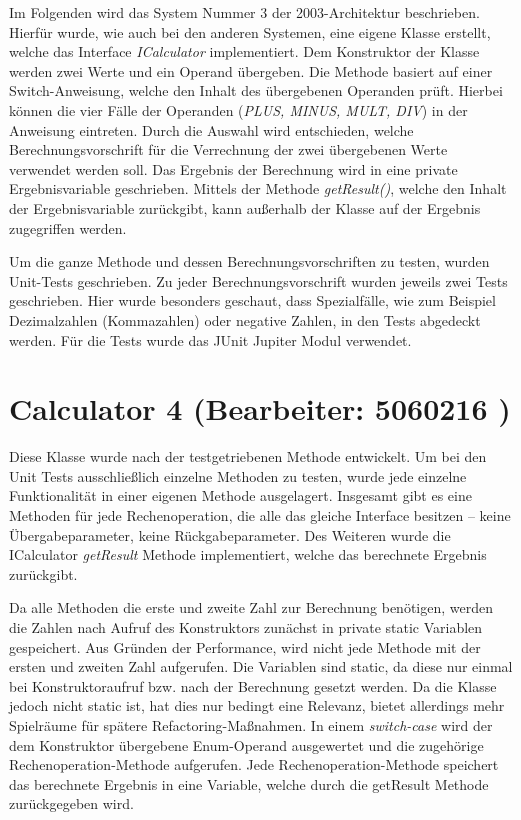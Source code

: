 Im Folgenden wird das System Nummer 3 der 2003-Architektur beschrieben. Hierfür wurde, wie auch bei den anderen Systemen, eine eigene Klasse erstellt, welche das Interface \textit{ICalculator} implementiert. Dem Konstruktor der Klasse werden zwei Werte und ein Operand übergeben. Die Methode basiert auf einer Switch-Anweisung, welche den Inhalt des übergebenen Operanden prüft. Hierbei können die vier Fälle der Operanden (\textit{PLUS, MINUS, MULT, DIV}) in der Anweisung eintreten. Durch die Auswahl wird entschieden, welche Berechnungsvorschrift für die Verrechnung der zwei übergebenen Werte verwendet werden soll.  Das Ergebnis der Berechnung wird in eine private Ergebnisvariable geschrieben. Mittels der Methode \textit{getResult()}, welche den Inhalt der Ergebnisvariable zurückgibt, kann außerhalb der Klasse auf der Ergebnis zugegriffen werden. 


Um die ganze Methode und dessen Berechnungsvorschriften zu testen, wurden Unit-Tests geschrieben. Zu jeder Berechnungsvorschrift wurden jeweils zwei Tests geschrieben. Hier wurde besonders geschaut, dass Spezialfälle, wie zum Beispiel Dezimalzahlen (Kommazahlen) oder negative Zahlen, in den Tests abgedeckt werden. Für die Tests wurde das JUnit Jupiter Modul verwendet.


\chapter{Calculator 4 (Bearbeiter: 5060216 )}

Diese Klasse wurde nach der testgetriebenen Methode entwickelt. Um bei den Unit Tests ausschließlich einzelne Methoden zu testen, wurde jede einzelne Funktionalität in einer eigenen Methode ausgelagert. Insgesamt gibt es eine Methoden für jede Rechenoperation, die alle das gleiche Interface besitzen – keine Übergabeparameter, keine Rückgabeparameter. Des Weiteren wurde die ICalculator \textit{getResult} Methode implementiert, welche das berechnete Ergebnis zurückgibt.

Da alle Methoden die erste und zweite Zahl zur Berechnung benötigen, werden die Zahlen nach Aufruf des Konstruktors zunächst in private static Variablen gespeichert. Aus Gründen der Performance, wird nicht jede Methode mit der ersten und zweiten Zahl aufgerufen. Die Variablen sind static, da diese nur einmal bei Konstruktoraufruf bzw. nach der Berechnung gesetzt werden. Da die Klasse jedoch nicht static ist, hat dies nur bedingt eine Relevanz, bietet allerdings mehr Spielräume für spätere Refactoring-Maßnahmen.
In einem \textit{switch-case} wird der dem Konstruktor übergebene Enum-Operand ausgewertet und die zugehörige Rechenoperation-Methode aufgerufen. Jede Rechenoperation-Methode speichert das berechnete Ergebnis in eine Variable, welche durch die getResult Methode zurückgegeben wird.

